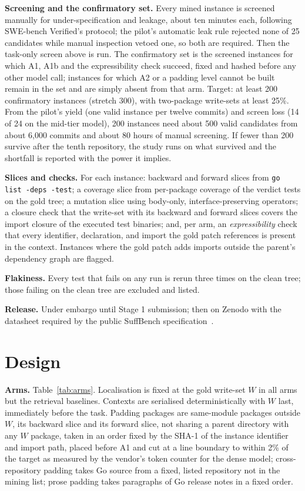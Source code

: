 \documentclass[10pt,conference]{IEEEtran}
\begin{document}
\textbf{Screening and the confirmatory set.}\label{sec:screen} Every mined instance is screened manually for under-specification and leakage, about ten minutes each, following SWE-bench Verified's protocol; the pilot's automatic leak rule rejected none of 25 candidates while manual inspection vetoed one, so both are required. Then the task-only screen above is run. The confirmatory set is the screened instances for which A1, A1b and the expressibility check succeed, fixed and hashed before any other model call; instances for which A2 or a padding level cannot be built remain in the set and are simply absent from that arm. Target: at least 200 confirmatory instances (stretch 300), with two-package write-sets at least 25\%. From the pilot's yield (one valid instance per twelve commits) and screen loss (14 of 24 on the mid-tier model), 200 instances need about 500 valid candidates from about 6,000 commits and about 80 hours of manual screening. If fewer than 200 survive after the tenth repository, the study runs on what survived and the shortfall is reported with the power it implies.

\textbf{Slices and checks.} For each instance: backward and forward slices from \texttt{go list -deps -test}; a coverage slice from per-package coverage of the verdict tests on the gold tree; a mutation slice using body-only, interface-preserving operators; a closure check that the write-set with its backward and forward slices covers the import closure of the executed test binaries; and, per arm, an \emph{expressibility} check that every identifier, declaration, and import the gold patch references is present in the context. Instances where the gold patch adds imports outside the parent's dependency graph are flagged.

\textbf{Flakiness.} Every test that fails on any run is rerun three times on the clean tree; those failing on the clean tree are excluded and listed.

\textbf{Release.} Under embargo until Stage 1 submission; then on Zenodo with the datasheet required by the public SuffBench specification~\cite{suffbenchspec}.

\section{Design}

\textbf{Arms.} Table~\ref{tab:arms}. Localisation is fixed at the gold write-set $W$ in all arms but the retrieval baselines. Contexts are serialised deterministically with $W$ last, immediately before the task. Padding packages are same-module packages outside $W$, its backward slice and its forward slice, not sharing a parent directory with any $W$ package, taken in an order fixed by the SHA-1 of the instance identifier and import path, placed before A1 and cut at a line boundary to within 2\% of the target as measured by the vendor's token counter for the dense model; cross-repository padding takes Go source from a fixed, listed repository not in the mining list; prose padding takes paragraphs of Go release notes in a fixed order.
\end{document}
